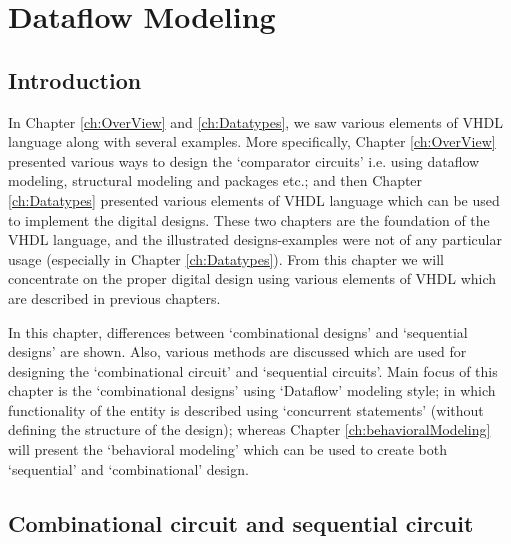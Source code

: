 \chapter{Dataflow Modeling} \label{ch:dataflowModeling}

\graphicspath{{Chapters/Dataflow/Figures/}}


%

\section{Introduction}
In Chapter \ref{ch:OverView} and \ref{ch:Datatypes}, we saw various elements of VHDL language along with several examples. More specifically, Chapter \ref{ch:OverView} presented various ways to design the `comparator circuits' i.e. using dataflow modeling, structural modeling and packages etc.; and then Chapter \ref{ch:Datatypes} presented various elements of VHDL language which can be used to implement the digital designs. These two chapters are the foundation of the VHDL language, and the illustrated designs-examples were not of any particular usage (especially in Chapter \ref{ch:Datatypes}). From this chapter we will concentrate on the proper digital design using various elements of VHDL which are described in previous chapters.  

In this chapter, differences between `combinational designs' and `sequential designs' are shown. Also, various methods are discussed which are used for designing the `combinational circuit' and `sequential circuits'. Main focus of this chapter is the `combinational designs' using `Dataflow' modeling style; in which functionality of the entity is described using `concurrent statements' (without defining the structure of the design); whereas Chapter \ref{ch:behavioralModeling} will present the `behavioral modeling' which can be used to create both `sequential' and `combinational' design. 

\section{Combinational circuit and sequential circuit}

